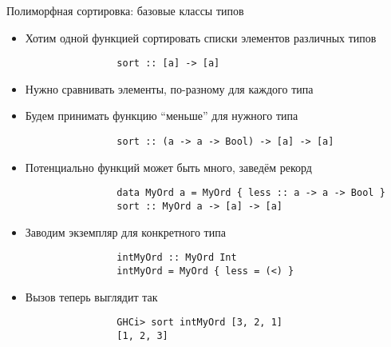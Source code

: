 
    \begin{frame}[fragile]{Полиморфная сортировка: базовые классы типов}
        \begin{itemize}
            \item Хотим одной функцией сортировать списки элементов различных типов
            \begin{verbatim}
                sort :: [a] -> [a]
            \end{verbatim}
            \item Нужно сравнивать элементы, по-разному для каждого типа
            \item[\then] Будем принимать функцию ``меньше'' для нужного типа
            \begin{verbatim}
                sort :: (a -> a -> Bool) -> [a] -> [a]
            \end{verbatim}
            \item Потенциально функций может быть много, заведём рекорд
            \begin{verbatim}
                data MyOrd a = MyOrd { less :: a -> a -> Bool }
                sort :: MyOrd a -> [a] -> [a]
            \end{verbatim}
            \item Заводим экземпляр для конкретного типа
            \begin{verbatim}
                intMyOrd :: MyOrd Int
                intMyOrd = MyOrd { less = (<) }
            \end{verbatim}
            \item Вызов теперь выглядит так
            \begin{verbatim}
                GHCi> sort intMyOrd [3, 2, 1]
                [1, 2, 3]
            \end{verbatim}
        \end{itemize}
    \end{frame}

